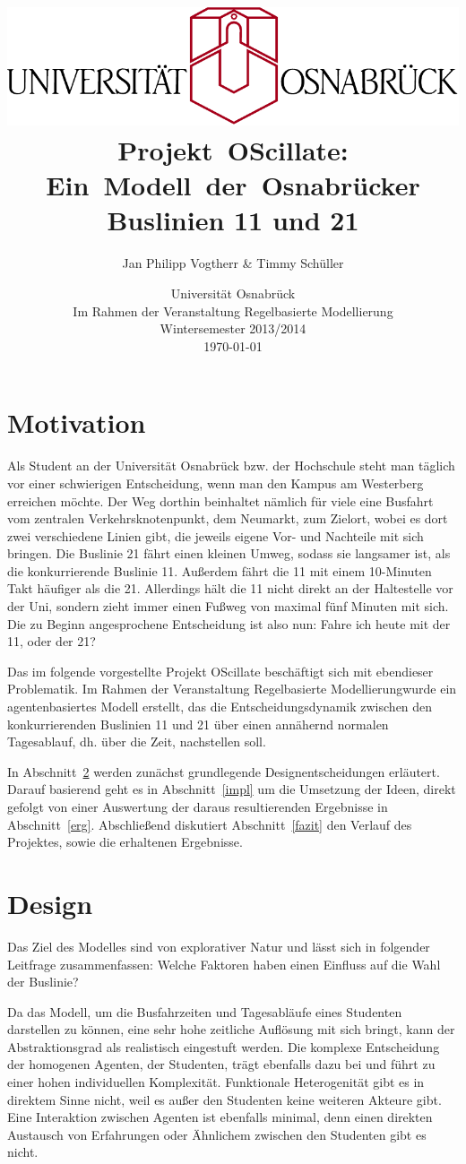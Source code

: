 \documentclass[12pt,a4paper]{scrartcl}
\author{Jan Philipp Vogtherr \& Timmy Schüller\vspace{0.5cm}}
\title{\includegraphics[scale=0.8]{unilogo.pdf}\vspace*{1cm}
\mbox{Projekt OScillate:} \mbox{Ein Modell der Osnabrücker} Buslinien 11 und 21\vspace{0.3cm}}
\date{Universität Osnabrück \\
Im Rahmen der Veranstaltung \glqq Regelbasierte Modellierung\grqq \\
\vspace*{0.4cm}
Wintersemester 2013/2014 \\
\today}
\begin{document}
\maketitle
\thispagestyle{empty}
\newpage
\tableofcontents
\newpage

\section{Motivation}
Als Student an der Universität Osnabrück bzw. der Hochschule steht man täglich vor einer schwierigen Entscheidung, wenn man den Kampus am Westerberg erreichen möchte. Der Weg dorthin beinhaltet nämlich für viele eine Busfahrt vom zentralen Verkehrsknotenpunkt, dem Neumarkt, zum Zielort, wobei es dort zwei verschiedene Linien gibt, die jeweils eigene Vor- und Nachteile mit sich bringen. Die Buslinie 21 fährt einen kleinen Umweg, sodass sie langsamer ist, als die konkurrierende Buslinie 11. Außerdem fährt die 11 mit einem 10-Minuten Takt häufiger als die 21. Allerdings hält die 11 nicht direkt an der Haltestelle vor der Uni, sondern zieht immer einen Fußweg von maximal fünf Minuten mit sich. Die zu Beginn angesprochene Entscheidung ist also nun: \glqq Fahre ich heute mit der 11, oder der 21?\grqq

Das im folgende vorgestellte Projekt OScillate beschäftigt sich  mit ebendieser Problematik. Im Rahmen der Veranstaltung \glqq Regelbasierte Modellierung\grqq  wurde ein agentenbasiertes Modell erstellt, das die Entscheidungsdynamik %
zwischen den konkurrierenden Buslinien 11 und 21 über einen annähernd normalen Tagesablauf, dh. über die Zeit, nachstellen soll.

In Abschnitt~\ref{design} werden zunächst grundlegende Designentscheidungen erläutert. Darauf basierend geht es in Abschnitt~\ref{impl} um die Umsetzung der Ideen, direkt gefolgt von einer Auswertung der daraus resultierenden Ergebnisse in Abschnitt~\ref{erg}. Abschließend diskutiert Abschnitt~\ref{fazit} den Verlauf des Projektes, sowie die erhaltenen Ergebnisse.

\section{Design}\label{design}
Das Ziel des Modelles sind von explorativer Natur und lässt sich in folgender Leitfrage zusammenfassen: \glqq Welche Faktoren haben einen Einfluss auf die Wahl der Buslinie?\grqq 

Da das Modell, um die Busfahrzeiten und Tagesabläufe eines Studenten darstellen zu können,  eine sehr hohe zeitliche Auflösung mit sich bringt, kann der Abstraktionsgrad als realistisch eingestuft werden. Die komplexe Entscheidung der homogenen Agenten, der Studenten, trägt ebenfalls dazu bei und führt zu einer hohen individuellen Komplexität. Funktionale Heterogenität gibt es in direktem Sinne nicht, weil es außer den Studenten keine weiteren Akteure gibt. Eine Interaktion zwischen Agenten ist ebenfalls minimal, denn einen direkten Austausch von Erfahrungen oder Ähnlichem zwischen den Studenten gibt es nicht.
\end{document}
